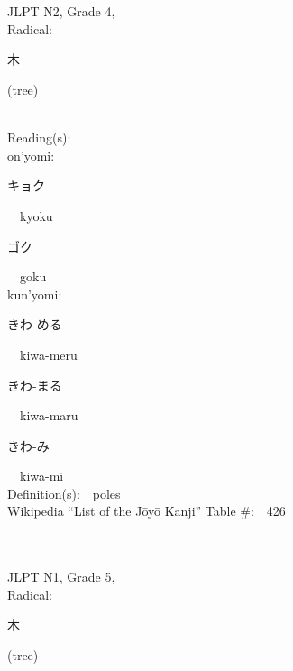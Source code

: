 \begin{multicols}{2}
\ \ \\
{\fontsize{34pt}{40pt}  }\ \ \\  %
{JLPT N2, Grade 4, \\Radical:\ \ {\begin{CJK}{UTF8}{min} 木 \end{CJK}} (tree) } \\
Reading(s):\ \ \\
{\hspace*{1em}}on'yomi:\ \ \\
{\hspace*{2em}}{\begin{CJK}{UTF8}{min} キョク \end{CJK}}\ \ kyoku\ \ \\
{\hspace*{2em}}{\begin{CJK}{UTF8}{min} ゴク \end{CJK}}\ \ goku\ \ \\
{\hspace*{1em}}kun'yomi:\ \ \\
{\hspace*{2em}}{\begin{CJK}{UTF8}{min} きわ-める \end{CJK}}\ \ kiwa-meru\ \ \\
{\hspace*{2em}}{\begin{CJK}{UTF8}{min} きわ-まる \end{CJK}}\ \ kiwa-maru\ \ \\
{\hspace*{2em}}{\begin{CJK}{UTF8}{min} きわ-み \end{CJK}}\ \ kiwa-mi\ \ \\
Definition(s):\ \ poles \\
Wikipedia ``List of the J\=oy\=o Kanji'' Table \#:\ \ 426 \\
\ \ \\
{\fontsize{34pt}{40pt}  }\ \ \\  %
{JLPT N1, Grade 5, \\Radical:\ \ {\begin{CJK}{UTF8}{min} 木 \end{CJK}} (tree) } \\

\end{multicols}
